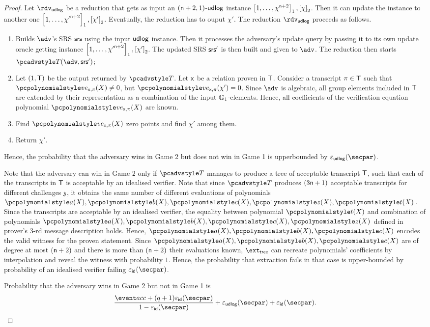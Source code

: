 \begin{proof}
  Let $\rdvudlog$ be a reduction that gets as input an $(\mathsf{n} + 2, 1)$-$\mathsf{udlog}$ instance $\left[1, \ldots, \chi^{\mathsf{n}+2}\right]_{1}, \left[\chi\right]_{2}$. Then it can update the instance to another one $\left[1, \ldots, {\chi'}^{\mathsf{n}+2}\right]_{1}, \left[\chi'\right]_{2}$. Eventually, the reduction has to ouput $\chi'$.
	The reduction $\rdvudlog$ proceeds as follows.
	\begin{enumerate}
			\item Builds $\adv$'s SRS $\mathsf{srs}$ using the input $\mathsf{udlog}$ instance. Then it processes the adversary's update query by passing it to its own update oracle getting instance $\left[1, \ldots, {\chi'}^{\mathsf{n}+2}\right]_{1}, \left[\chi'\right]_{2}$. The updated SRS $\mathsf{srs}'$ is then built and given to $\adv$. The reduction then starts $\tdv(\adv, \srs')$;
			\item Let $(1, \mathsf{T})$ be the output returned by $\tdv$. Let $\mathsf{x}$ be a relation proven in $\mathsf{T}$.  Consider a transcript $\pi \in \mathsf{T}$ such that $\vereq_{\inp, \zkproof}(X) \neq 0$, but $\vereq_{\inp, \zkproof}(\chi') = 0$. Since $\adv$ is algebraic, all group
			elements included in $\mathsf{T}$ are extended by their representation as a combination of the input $\mathbb{G}_1$-elements. Hence, all coefficients of the verification equation polynomial $\vereq_{\inp, \zkproof}(X)$ are known. 
			\item Find $\vereq_{\inp, \zkproof}(X)$ zero points and find $\chi'$ among
			them.
			\item Return  $\chi'$.
      \end{enumerate}
    
    Hence, the probability that the adversary wins in Game 2 but does not win in Game 1 is upperbounded by $\epsudlog (\secpar)$.

  Note that the adversary can win in Game 2 only if $\tdv$ manages to produce a tree of acceptable transcript $\mathsf{T}$, such that each of the transcripts in $\mathsf{T}$ is acceptable by an idealised verifier. Note that since $\tdv$ produces $(3 \mathsf{n} + 1)$ acceptable transcripts for different challenges $\mathfrak{z}$, it obtains the same number of different evaluations of polynomials $\p{a} (X), \p{b} (X), \p{c} (X), \p{z} (X), \p{t} (X)$. Since the transcripts are acceptable by an idealised verifier, the equality between polynomial $\p{t} (X)$ and combination of polynomials $\p{a} (X), \p{b} (X), \p{c} (X), \p{z} (X)$ defined in prover's $3$-rd message description holds. Hence, $\p{a} (X), \p{b} (X), \p{c} (X)$ encodes the valid witness for the proven statement. Since $\p{a} (X), \p{b} (X), \p{c} (X)$ are of degree at most $(\mathsf{n} + 2)$ and there is more than $(\mathsf{n} + 2)$ their evaluations known, $\extt$ can recreate polynomials' coefficients by interpolation and reveal the witness with probability $1$. Hence, the probability that extraction fails in that case is upper-bounded by probability of an idealised verifier failing $\epsid(\secpar)$.

  Probability that the adversary wins in Game 2 but not in Game 1 is 
  \[
  \frac{\accProb + (q + 1) \epsid (\secpar)}{1 - \epsid (\secpar)} + \epsudlog(\secpar)  + \epsid (\secpar). 
  \]
 \end{proof}
  

